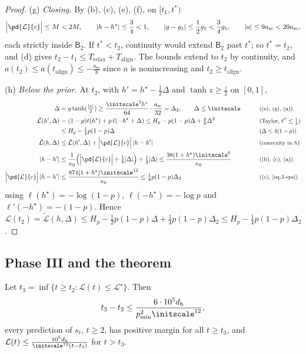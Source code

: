 \begin{proof}
\smallskip\noindent(g) \emph{Closing.} By (b), (c), (e), (f), on $[t_1,t^\ast)$
\[
 \Bigl|\pd{\mathcal L}{c}\Bigr|\le M<2M,\qquad |h-h^\star|\le\frac{3}{4}<1,\qquad |g-g_1|\le\frac{1}{2}g_1<\frac{3}{4}g_1,\qquad |a|\le9a_{\mathrm{sc}}<20a_{\mathrm{sc}},
\]
each strictly inside $\mathsf B_2$. If $t^\ast<t_2$, continuity would extend $\mathsf B_2$ past $t^\ast$; so $t^\ast=t_2$, and (d) gives
$t_2-t_1\le T_{\mathrm{relax}}+T_{\mathrm{align}}$. The bounds extend to $t_2$ by continuity, and $a(t_2)\le a(t_{\mathrm{align}})\le-\frac{a_{\mathrm{sc}}}{8}$ since $a$ is
nonincreasing and $t_2\ge t_{\mathrm{align}}$.

\smallskip\noindent(h) \emph{Below the prior.} At $t_2$, with $h'=h^\star-\frac{1}{2}\Delta$ and $\tanh z\ge\frac{z}{2}$ on $[0,1]$,
\begin{alignat*}{2}
 \Delta&=g\tanh(\tfrac{|a|}{2})\ge\frac{\initscale^2h^\star}{64}\cdot\frac{a_{\mathrm{sc}}}{32}=\Delta_2,\qquad \Delta\le\initscale &\qquad& \why{(e), (g), (a)}\\
 \tilde{\mathcal L}(h',\Delta)&=(1-p)\ell(h^\star)+p\,\ell(-h^\star+\Delta)\le H_p-p(1-p)\Delta+\tfrac{p}{8}\Delta^2 && \why{Taylor, $\ell''\le\tfrac{1}{4}$}\\
 &\le H_p-\tfrac{1}{2}p(1-p)\Delta && \why{$\Delta\le4(1-p)$}\\
 \tilde{\mathcal L}(h,\Delta)&\le\tilde{\mathcal L}(h',\Delta)+\Bigl|\pd{\mathcal L}{c}\Bigr|\,|h-h'| && \why{convexity in $h$}\\
 |h-h'|&\le\frac{1}{\kappa_0}\Bigl(\Bigl|\pd{\mathcal L}{c}\Bigr|+\tfrac{1}{8}|\Delta|\Bigr)+\tfrac{1}{2}|\Delta|\le\frac{38(1+h^\star)\initscale^6}{\kappa_0} && \why{(b), (c), (a)}\\
 \Bigl|\pd{\mathcal L}{c}\Bigr|\,|h-h'|&\le\frac{874(1+h^\star)\initscale^{12}}{\kappa_0}\le\tfrac{1}{4}p(1-p)\Delta_2 && \why{(c), \cref{eq:J-eps}}
\end{alignat*}
using $\ell(h^\star)=-\log(1-p)$, $\ell(-h^\star)=-\log p$ and $\ell'(-h^\star)=-(1-p)$. Hence
$\mathcal L(t_2)=\tilde{\mathcal L}(h,\Delta)\le H_p-\frac{1}{2}p(1-p)\Delta+\frac{1}{4}p(1-p)\Delta_2\le H_p-\frac{1}{4}p(1-p)\Delta_2$.
\end{proof}

\subsection{Phase III and the theorem}

\begin{lemma}[Descent]
\label{lem:J-descent}
Let $t_3=\inf\{t\ge t_2:\mathcal L(t)\le \mathcal L^\star\}$. Then
\[
 t_3-t_2\le\frac{6\cdot10^5d_{\mathrm h}}{p_{\min}^2\initscale^{12}},
\]
every prediction of $s_t$, $t\ge2$, has positive margin for all $t\ge t_3$, and $\mathcal L(t)\le\frac{10^5d_{\mathrm h}}{\initscale^{12}(t-t_3)}$ for $t>t_3$.
\end{lemma}

